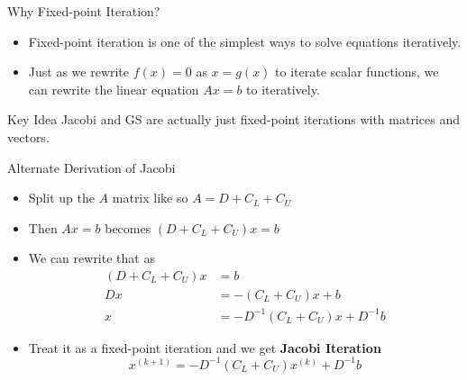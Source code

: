 \documentclass[10pt]{beamer}
\begin{document}

\begin{frame}{Why Fixed-point Iteration?}
\begin{itemize}
    \item Fixed-point iteration is one of the simplest ways to solve equations iteratively.\\[5mm] 
    
    \item Just as we rewrite $f(x)=0$ as $x=g(x)$ to iterate scalar functions, we can rewrite the linear equation $Ax=b$ to iteratively.\\[5mm] 
\end{itemize}

\begin{block}{Key Idea}
    Jacobi and GS are actually just fixed-point iterations with matrices and vectors.    
\end{block}
\end{frame}


\begin{frame}{Alternate Derivation of Jacobi}
    \begin{itemize}
        \item Split up the $A$ matrix like so $A = D +C_L + C_U$
            \vspace{3mm}
        \item Then $Ax=b$ becomes $(D +C_L + C_U)x = b$
            \vspace{3mm}
        \item We can rewrite that as 
            \begin{align*}
                (D +C_L + C_U)x &= b\\
                Dx &=   -(C_L + C_U)x + b\\
                x &=   -D^{-1}(C_L + C_U)x + D^{-1}b
            \end{align*}
        \item Treat it as a fixed-point iteration and we get \textbf{Jacobi Iteration} 
            $$ x^{(k+1)} =  -D^{-1}(C_L + C_U)x^{(k)} + D^{-1}b$$
    \end{itemize}
\end{frame}

\end{document}
